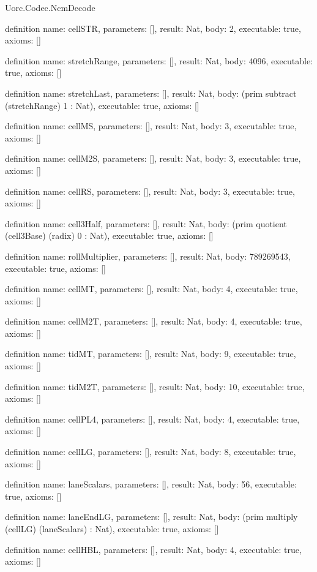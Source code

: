 \begin{lexlean}{Uorc.Codec.NcmDecode}
\begin{semanticmodule}
definition{
  name: cellSTR,
  parameters: [],
  result: Nat,
  body: 2,
  executable: true,
  axioms: []
}

definition{
  name: stretchRange,
  parameters: [],
  result: Nat,
  body: 4096,
  executable: true,
  axioms: []
}

definition{
  name: stretchLast,
  parameters: [],
  result: Nat,
  body: (prim subtract (stretchRange) 1 : Nat),
  executable: true,
  axioms: []
}

definition{
  name: cellMS,
  parameters: [],
  result: Nat,
  body: 3,
  executable: true,
  axioms: []
}

definition{
  name: cellM2S,
  parameters: [],
  result: Nat,
  body: 3,
  executable: true,
  axioms: []
}

definition{
  name: cellRS,
  parameters: [],
  result: Nat,
  body: 3,
  executable: true,
  axioms: []
}

definition{
  name: cell3Half,
  parameters: [],
  result: Nat,
  body: (prim quotient (cell3Base) (radix) 0 : Nat),
  executable: true,
  axioms: []
}

definition{
  name: rollMultiplier,
  parameters: [],
  result: Nat,
  body: 789269543,
  executable: true,
  axioms: []
}

definition{
  name: cellMT,
  parameters: [],
  result: Nat,
  body: 4,
  executable: true,
  axioms: []
}

definition{
  name: cellM2T,
  parameters: [],
  result: Nat,
  body: 4,
  executable: true,
  axioms: []
}

definition{
  name: tidMT,
  parameters: [],
  result: Nat,
  body: 9,
  executable: true,
  axioms: []
}

definition{
  name: tidM2T,
  parameters: [],
  result: Nat,
  body: 10,
  executable: true,
  axioms: []
}

definition{
  name: cellPL4,
  parameters: [],
  result: Nat,
  body: 4,
  executable: true,
  axioms: []
}

definition{
  name: cellLG,
  parameters: [],
  result: Nat,
  body: 8,
  executable: true,
  axioms: []
}

definition{
  name: laneScalars,
  parameters: [],
  result: Nat,
  body: 56,
  executable: true,
  axioms: []
}

definition{
  name: laneEndLG,
  parameters: [],
  result: Nat,
  body: (prim multiply (cellLG) (laneScalars) : Nat),
  executable: true,
  axioms: []
}

definition{
  name: cellHBL,
  parameters: [],
  result: Nat,
  body: 4,
  executable: true,
  axioms: []
}


\end{semanticmodule}
\end{lexlean}
